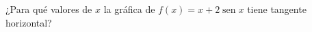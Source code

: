\setcounter{enumi}{38}
\item ¿Para qué valores de $x$ la gráfica de $f(x) = x + 2 \operatorname{sen} x$ tiene tangente horizontal?
